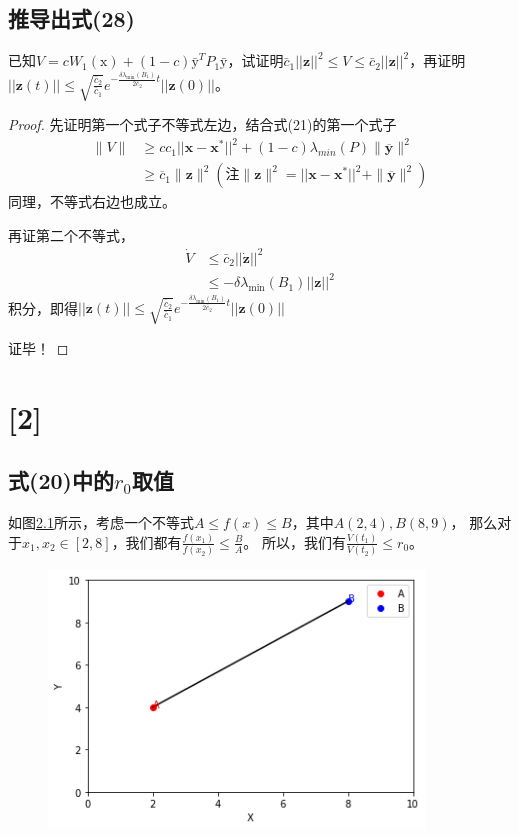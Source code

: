 \documentclass[lang=cn,10pt]{elegantbook}
\newcommand\bv[1]{\boldsymbol{#1}}
\begin{document}
\section{推导出式(28)}
已知$V=cW_1(\mathrm{x})+(1-c)\bar{\mathrm{y}}^TP_1\bar{\mathrm{y}}$，试证明$\bar{c}_1||\mathbf{z}||^2\leq V\leq\bar{c}_2||\mathbf{z}||^2$，再证明
$||\mathbf{z}(t)||\leq\sqrt{\frac{\bar{c}_{2}}{\bar{c}_{1}}}e^{-\frac{\delta\lambda_{\min}(B_{1})}{2\bar{c}_{2}}t}||\mathbf{z}(0)||$。
\begin{proof}
	先证明第一个式子不等式左边，结合式(21)的第一个式子
	\begin{equation*}
		\begin{aligned}
			\|V\| & \geq cc_1||\mathbf{x}-\mathbf{x}^*||^2 + (1-c)\lambda_{min}(P)\|\bv{\overline{y}}\|^2                        \\
			      & \geq \overline{c}_1 \|\bv{z}\|^2(\text{注}\|\bv{z}\|^2=||\mathbf{x}-\mathbf{x}^*||^2+\|\bv{\overline{y}}\|^2)
		\end{aligned}
	\end{equation*}
	同理，不等式右边也成立。

	再证第二个不等式，
	\begin{equation*}
		\begin{aligned}
			\dot{V} & \leq \bar{c}_{2}||\mathbf{\dot{z}}||^{2}        \\
			        & \leq -\delta\lambda_{\min}(B_1)||\mathbf{z}||^2
		\end{aligned}
	\end{equation*}
	积分，即得$||\mathbf{z}(t)||\leq\sqrt{\frac{\bar{c}_{2}}{\bar{c}_{1}}}e^{-\frac{\delta\lambda_{\min}(B_{1})}{2\bar{c}_{2}}t}||\mathbf{z}(0)||$

	证毕！
\end{proof}

\chapter{[2]}
\section{式(20)中的$r_0$取值}
如图\ref{imB_1}所示，考虑一个不等式$A\leq f(x) \leq B$，其中$A(2,4),B(8,9)$，
那么对于$x_1,x_2\in [2,8]$，我们都有$\frac{f(x_1)}{f(x_2)}\leq\frac BA$。
所以，我们有$\frac{V(t_1)}{V(t_2)}\leq r_0$。

\begin{figure}[hp]
	\centering
	\includegraphics[width=10cm]{img/imB_1.png}
	\caption{}
	\label{imB_1}
\end{figure}
\end{document}
